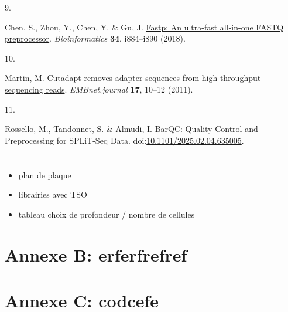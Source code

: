\documentclass[
  11pt,
  a4paper,
]{report}
\providecommand{\tightlist}{%
  \setlength{\itemsep}{0pt}\setlength{\parskip}{0pt}}\usepackage{longtable,booktabs,array}
\newlength{\cslhangindent}
\newlength{\csllabelwidth}
\newenvironment{CSLReferences}[2] %
 {\begin{list}{}{%
  \setlength{\itemindent}{0pt}
  \setlength{\leftmargin}{0pt}
  \setlength{\parsep}{0pt}
  \ifodd #1
   \setlength{\leftmargin}{\cslhangindent}
   \setlength{\itemindent}{-1\cslhangindent}
  \fi
  \setlength{\itemsep}{#2\baselineskip}}}
 {\end{list}}
\newcommand{\CSLLeftMargin}[1]{\parbox[t]{\csllabelwidth}{\strut#1\strut}}
\newcommand{\CSLRightInline}[1]{\parbox[t]{\linewidth - \csllabelwidth}{\strut#1\strut}}
\begin{document}
\begin{CSLReferences}{0}{0}
\CSLLeftMargin{9. }%
\CSLRightInline{Chen, S., Zhou, Y., Chen, Y. \& Gu, J.
\href{https://doi.org/10.1093/bioinformatics/bty560}{Fastp: An
ultra-fast all-in-one FASTQ preprocessor}. \emph{Bioinformatics}
\textbf{34}, i884--i890 (2018).}

\CSLLeftMargin{10. }%
\CSLRightInline{Martin, M.
\href{https://doi.org/10.14806/ej.17.1.200}{Cutadapt removes adapter
sequences from high-throughput sequencing reads}. \emph{EMBnet.journal}
\textbf{17}, 10--12 (2011).}

\CSLLeftMargin{11. }%
\CSLRightInline{Rossello, M., Tandonnet, S. \& Almudi, I. BarQC: Quality
Control and Preprocessing for SPLiT-Seq Data.
doi:\href{https://doi.org/10.1101/2025.02.04.635005}{10.1101/2025.02.04.635005}.}

\end{CSLReferences}

\cleardoublepage
{}
{}
\appendix

\chapter{}\label{section-1}

\begin{itemize}
\tightlist
\item
  plan de plaque
\item
  librairies avec TSO
\item
  tableau choix de profondeur / nombre de cellules
\end{itemize}

\chapter{Annexe B: erferfrefref}\label{annexe-b}

\chapter{Annexe C: codcefe}\label{annexe-c}

\clearpage
\thispagestyle{empty}
\vspace*{\fill}
\vspace*{\fill}
\clearpage
\end{document}
